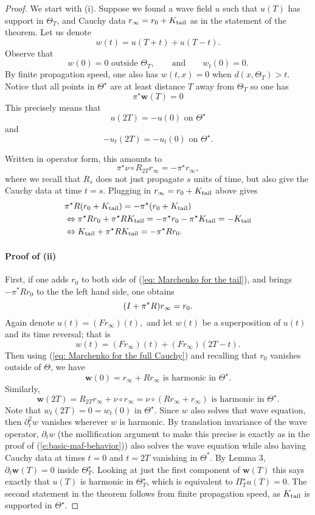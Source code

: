 \documentclass[10pt]{article}
\theoremstyle{plain}
\theoremstyle{definition}
\theoremstyle{remark}
\numberwithin{theorem}{section}
\numberwithin{example}{section}
\numberwithin{equation}{section}
\numberwithin{figure}{section}
\def\beq{\begin{equation} }
\def\eeq{\end{equation}}
\def \p { \partial}
\newcommand\tail{_{\textup{tail}}}
\begin{document}
\begin{proof}
We start with (i).
Suppose we found a wave field $u$ such that $u(T)$ has support in $\Theta_T$, and Cauchy data $r_{\infty} = r_0 + K\tail$ as in the statement of the theorem. Let us denote
$$ w(t) = u(T+t) + u(T-t).$$
Observe that
$$ w(0) =0 \text{ outside }\Theta_T, \qquad \text{and} \qquad
w_t(0) = 0.
$$
By finite propagation speed, one also has $w(t,x) = 0$ when $d(x,\Theta_T) > t$. Notice that all points in $\Theta^\star$ are at least distance $T$ away from $\Theta_T$ so one has
$$ \pi^\star \mathbf{w}(T) = 0$$
This precisely means that
$$ u(2T) = - u(0) \text{ on }\Theta^\star$$
and
$$ - u_t(2T) = -u_t(0) \text{ on } \Theta^\star.$$

Written in operator form, this amounts to
$$ \pi^\star\nu \circ R_{2T}r_{\infty} = -\pi^\star r_{\infty},$$
where we recall that $R_s$ does not just propagate $s$ units of time, but also give the Cauchy data at time $t=s$.
Plugging in $r_{\infty} = r_0 + K\tail$ above gives
\begin{align}\label{eq: Marchenko for the tail}
 &\pi^\star R(r_0 + K\tail) = -\pi^\star (r_0 + K\tail)
\nonumber \\
&\Leftrightarrow \pi^\star R r_0 + \pi^\star RK\tail = -\pi^\star r_0 -\pi^\star K\tail = -K\tail
\nonumber \\
 &\Leftrightarrow K\tail + \pi^\star RK\tail = -\pi^\star Rr_0.
\end{align}

\paragraph{Proof of (ii)}
First, if one adds $r_0$ to both side of (\ref{eq: Marchenko for the tail}), and brings $-\pi^*R r_0$ to the the left hand side, one obtains
\beq{ \label{eq: Marchenko for the full Cauchy}
(I + \pi^*R)r_{\infty} = r_0.
}\eeq
Again denote $u(t) = (Fr_{\infty})(t),$ and let $w(t)$ be a superposition of $u(t)$ and its time reversal; that is
$$ w(t) = (Fr_{\infty})(t) + (Fr_{\infty})(2T-t).$$
Then using (\ref{eq: Marchenko for the full Cauchy}) and recalling that $r_0$ vanishes outside of $\Theta$, we have
$$ \mathbf{w}(0) = r_{\infty} + R r_{\infty}  \text{ is harmonic in }\Theta^\star.$$
Similarly,
$$ \mathbf{w}(2T) = R_{2T}r_{\infty} + \nu \circ r_{\infty} = \nu \circ ( R r_{\infty} +  r_{\infty}) \text{ is harmonic in }\Theta^\star.$$
Note that $w_t(2T) = 0 = w_t(0)$ in $\Theta^\star$.
Since $w$ also solves that wave equation, then $\p^2_tw$ vanishes wherever $w$ is harmonic. By translation invariance of the wave operator, $\p_t w$ (the mollification argument to make this precise is exactly as in the proof of (\ref{e:basic-maf-behavior})) also solves the wave equation while also having Cauchy data at times $t=0$ and $t=2T$ vanishing in $\Theta^*$.
By Lemma 3, $\p_t\mathbf{ w}(T) = 0$ inside $\Theta^\star_T$. Looking at just the first component of $\mathbf{w}(T)$ this says exactly that $u(T)$ is harmonic in $\Theta^\star_T$, which is equivalent to $\Pi_T^\star u(T)=0$. The second statement in the theorem follows from finite propagation speed, as $K\tail$ is supported in $\Theta^\star$.


\end{proof}
\end{document}
